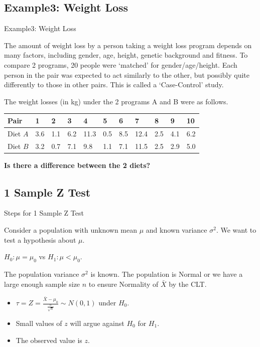 \documentclass[t,xcolor=pdftex,dvipsnames,table]{beamer}\usepackage[]{graphicx}\usepackage[]{color}
\begin{document}
\subsection[Example3]{Example3: Weight Loss}
\begin{frame}{Example3: Weight Loss}

The amount of weight loss by a person taking a weight loss program depends on many factors, including gender, age, height, genetic background and fitness.   
To compare 2 programs, 20 people were ‘matched’ for gender/age/height. Each person in the pair was expected to act similarly to the other, but possibly quite differently to those in other pairs. This is called a ‘Case-Control’ study. 

\vspace{.5cm}
The weight losses (in kg) under the 2 programs A and B were as follows.

\vspace{.5cm}
{\small \begin{tabular}{lllllllllll} \hline
Pair & 1 & 2 & 3 & 4 & 5 & 6 & 7 & 8 & 9 & 10 \\ \hline
Diet $A$ & 3.6 & 1.1 & 6.2 & 11.3 & 0.5 & 8.5 & 12.4 & 2.5 & 4.1 & 6.2 \\
Diet $B$ & 3.2 & 0.7 & 7.1 & 9.8 & 1.1 & 7.1 & 11.5 & 2.5 & 2.9 & 5.0 \\  \hline
\end{tabular}}

\vspace{.5cm}
{\bf Is there a difference between the 2 diets?}
\end{frame}


\subsection[Z Test]{1 Sample Z Test}
\begin{frame}[fragile]{Steps for 1 Sample Z Test}

Consider a population with unknown mean $\mu$ and known variance $\sigma^{2}$. We want to test a hypothesis about $\mu$.

\vspace{.5cm}
 $H_{0}: \mu = \mu_{0}$ vs $H_{1}: \mu < \mu_{0}$. 

\vspace{.5cm}
 The population variance $\sigma^{2}$ is known. The population is Normal or we have a large enough sample size $n$ to ensure Normality of $\bar{X}$ by the CLT.

\vspace{.5cm}
\begin{itemize}
\item $\tau = Z = \frac{\bar{X} - \mu_{0}}{\frac{\sigma}{\sqrt{n}}}  \sim N(0,1)$ under $H_{0}$. 
\item Small values of $z$ will argue against $H_{0}$ for $H_{1}$. 
\item The observed value is $z$. 
\end{itemize}

\end{frame}  
\end{document}
